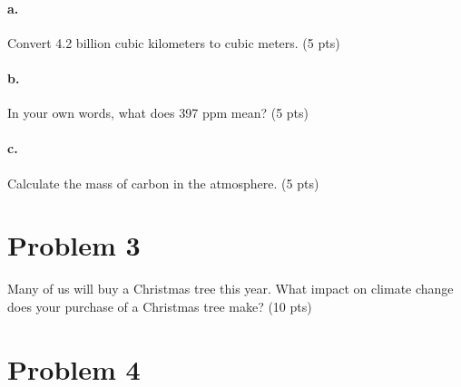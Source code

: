 \documentclass{article}
\newif\ifsolution
\newcommand{\solution}[1]
{\ifsolution
\vspace{10pt}
{\color{answer-color} #1}
\else\fi}
\newcommand{\ufrac}[2]{\frac{\textrm{#1}}{\textrm{#2}}}
\begin{document}
\paragraph{a.} Convert 4.2 billion cubic kilometers to cubic meters. (5 pts)

\solution{
To convert, we use 1000 meters equals 1 km and remember that this is a
cubic measure
$$ 4.2 \cdot 10^9 km^3 \cdot \frac{(1000m)^3}{(1km)^3} = 4.2 \cdot
10^{18} m^3$$
}

\paragraph{b.} In your own words, what does 397 ppm mean? (5 pts)

\solution{
For every unit volume of atmosphere, if we divide it into 1 million
equal volumes, with only one gas in each, 397 of those tiny volumes will
be carbon dioxide.
$$ \ufrac{397 parts carbon dioxide}{1 million parts atmosphere} $$
}

\paragraph{c.} Calculate the mass of carbon in the atmosphere. (5 pts)

\solution{
We multiply the total mass of the atmosphere by the fraction of carbon
dioxide by the density of carbon dioxide.
$$ 4.2 \cdot 10^{18} cubic meters
\ufrac{397 parts carbon dioxide}{1 million parts atmosphere}
\ufrac{1.9 kg}{cubic meter} = 3168 \cdot 10^{12} kg$$
}



\section*{Problem 3}

Many of us will buy a Christmas tree this year.  What impact on climate
change does your purchase of a Christmas tree make? (10 pts)

\solution{
This question asks you to think about the plausible impacts of growing
and then consuming a tree.  There are several impacts to consider.
During the tree's lifetime, it will sequester carbon in the wood.  When
the tree is discarded, it will begin to decompose and release that
carbon dioxide.  You may also consider the energy cost of felling and
transporting the tree.
}

\section*{Problem 4}
\end{document}
